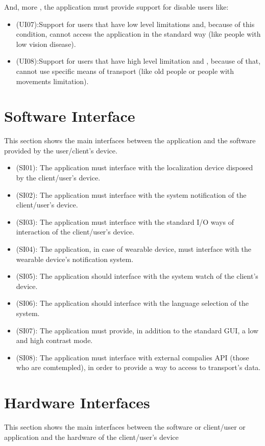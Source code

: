 \documentclass[a4paper,leqno]{book}
\begin{document}
And, more , the application must provide support for disable users like:
\begin{itemize}

\item (UI07):Support for users that have low level limitations and, because of this condition, cannot access the application in the standard way (like people with low vision disease). 
\item (UI08):Support for users that have high level limitation and , because of that, cannot use specific means of transport (like old people or people with movements limitation).

\end{itemize}

\section{Software Interface}
This section shows the main interfaces between the application and the software provided by the user/client's device.

\begin{itemize}
\item (SI01): The application must interface with the localization device disposed by the client/user's device.
\item (SI02): The application must interface with the system notification of the client/user's device.
\item (SI03): The application must interface with the standard I/O ways of interaction of the client/user's device.
\item (SI04): The application, in case of wearable device, must interface with the wearable device's notification system.
\item (SI05): The application should interface with the system watch of the client's device.
\item (SI06): The application should interface with the language selection of the system.
\item (SI07): The application must provide, in addition to the standard GUI, a low and high contrast mode. 
\item (SI08): The application must interface with external compalies API (those who are comtempled), in order to provide a way to access to transport's data.
\end{itemize}

\section{Hardware Interfaces}
This section shows the main interfaces between the software or client/user or application and the hardware of the client/user's device
\end{document}
